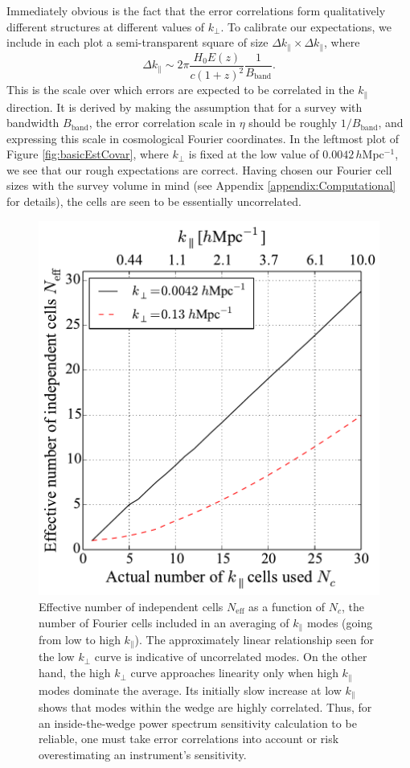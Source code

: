 \documentclass[twocolumn,aps,prd,nofootinbib,showpacs]{revtex4-1}
\begin{document}
Immediately obvious is the fact that the error correlations form qualitatively different structures at different values of $k_\perp$.  To calibrate our expectations, we include in each plot a semi-transparent square of size $\Delta k_\parallel \times \Delta k_\parallel$, where
\begin{equation}
\label{eq:kparaCorrLen}
\Delta k_\parallel \sim 2\pi \frac{ H_0 E(z)}{c (1+z)^2} \frac{1}{B_\textrm{band}}.
\end{equation}
This is the scale over which errors are expected to be correlated in the $k_\parallel$ direction.  It is derived by making the assumption that for a survey with bandwidth $B_\textrm{band}$, the error correlation scale in $\eta$ should be roughly $1/ B_\textrm{band}$, and expressing this scale in cosmological Fourier coordinates.  In the leftmost plot of Figure \ref{fig:basicEstCovar}, where $k_\perp$ is fixed at the low value of $0.0042\,h$Mpc$^{-1}$, we see that our rough expectations are correct.  Having chosen our Fourier cell sizes with the survey volume in mind (see Appendix \ref{appendix:Computational} for details), the cells are seen to be essentially uncorrelated.

\begin{figure}[t] 
	\centering 
	\includegraphics[width=.49\textwidth]{Neff.pdf}
	\caption{Effective number of independent cells $N_\textrm{eff}$ as a function of $N_c$, the number of Fourier cells included in an averaging of $k_\parallel$ modes (going from low to high $k_\parallel$).  The approximately linear relationship seen for the low $k_\perp$ curve is indicative of uncorrelated modes.  On the other hand, the high $k_\perp$ curve approaches linearity only when high $k_\parallel$ modes dominate the average.  Its initially slow increase at low $k_\parallel$ shows that modes within the wedge are highly correlated.  Thus, for an inside-the-wedge power spectrum sensitivity calculation to be reliable, one must take error correlations into account or risk overestimating an instrument's sensitivity.}
	\label{fig:Neff}
\end{figure}
\end{document}
